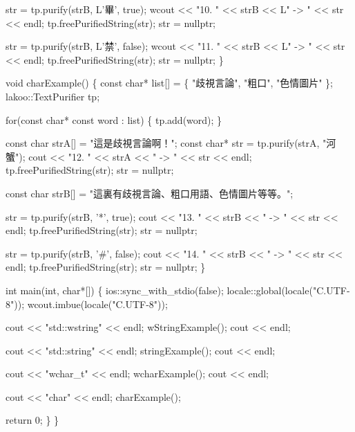 \begin{DoxyCode}
    str = tp.purify(strB, L'畢', true);
    wcout << "10. " << strB << L" -> " << str << endl;
    tp.freePurifiedString(str);
    str = nullptr;

    str = tp.purify(strB, L'禁', false);
    wcout << "11. " << strB << L" -> " << str << endl;
    tp.freePurifiedString(str);
    str = nullptr;
\}

void charExample()
\{
    const char* list[] = \{ "歧視言論", "粗口", "色情圖片" \};
    lakoo::TextPurifier tp;

    for(const char* const word : list)
    \{
        tp.add(word);
    \}

    const char strA[] = "這是歧視言論啊！";
    const char* str = tp.purify(strA, "河蟹");
    cout << "12. " << strA << " -> " << str << endl;
    tp.freePurifiedString(str);
    str = nullptr;

    const char strB[] = "這裏有歧視言論、粗口用語、色情圖片等等。";

    str = tp.purify(strB, '*', true);
    cout << "13. " << strB << " -> " << str << endl;
    tp.freePurifiedString(str);
    str = nullptr;

    str = tp.purify(strB, '#', false);
    cout << "14. " << strB << " -> " << str << endl;
    tp.freePurifiedString(str);
    str = nullptr;
\}

int main(int, char*[])
\{
    ios::sync\_with\_stdio(false);
    locale::global(locale("C.UTF-8"));
    wcout.imbue(locale("C.UTF-8"));

    cout << "std::wstring" << endl;
    wStringExample();
    cout << endl;

    cout << "std::string" << endl;
    stringExample();
    cout << endl;

    cout << "wchar\_t" << endl;
    wcharExample();
    cout << endl;

    cout << "char" << endl;
    charExample();

    return 0;
\}
\}
\end{DoxyCode}



